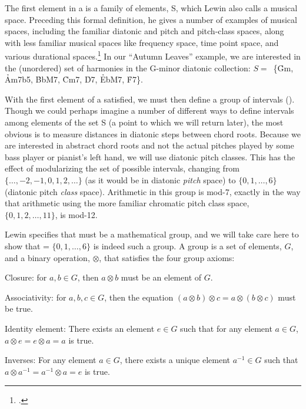 \documentclass[diss]{subfiles}
\begin{document}
The first element in a \gis{} is a family of elements, S, which Lewin also calls
a musical space. Preceding this formal definition, he gives a number of
examples of musical spaces, including the familiar diatonic and pitch and
pitch-class spaces, along with less familiar musical spaces like frequency
space, time point space, and various durational
spaces.\footcite[16--25]{lewin:gmit} In our “Autumn Leaves” example, we are
interested in the (unordered) set of harmonies in the G-minor diatonic
collection: \mbox{$S =$ \{\h{Gm},} \h{Am7b5}, \h{BbM7}, \h{Cm7}, \h{D7},
\h{EbM7}, \h{F7}\}.

With the first element of a \gis{} satisfied, we must then define a group of
intervals (\ivls). Though we could perhaps imagine a number of
different ways to define intervals among elements of the set S (a point to
which we will return later), the most obvious is to measure distances in
diatonic steps between chord roots. Because we are interested in abstract
chord roots and not the actual pitches played by some bass player or pianist’s
left hand, we will use diatonic pitch classes. This has the effect of
modularizing the set of possible intervals, changing \ivls{} from
$\{\ldots,-2,-1,0,1,2,\ldots\}$ (as it would be in diatonic \emph{pitch}
space) to $\{0,1,\ldots,6\}$ (diatonic pitch \emph{class} space).
Arithmetic in this group is mod-7, exactly in the way that arithmetic using
the more familiar chromatic pitch class space, $\{0,1,2,\ldots,11\}$, is
mod-12.

Lewin specifies that \ivls{} must be a mathematical group, and we will take care
here to show that \ivls{} = $\{0,1,\ldots,6\}$ is indeed such a group. A group
is a set of elements, $G$, and a binary operation, $\otimes$, that satisfies the
four group axioms:
\begin{compactitem}
  \singlespacing
  \item Closure: for $a, b \in  G$, then $a \otimes b$ must be an
    element of $G$.
  \item Associativity: for $a, b, c \in G$, then the equation $(a \otimes b)
    \otimes c = a \otimes (b \otimes c)$ must be true.
  \item Identity element: There exists an element $e \in G$ such that for any
    element $a \in G$, $a \otimes e = e \otimes a = a$ is true.
  \item Inverses: For any element $a \in G$, there exists a unique element
    $a^{-1} \in G$ such that $a \otimes a^{-1} = a^{-1} \otimes a = e$ is
    true.
\end{compactitem}
\end{document}

